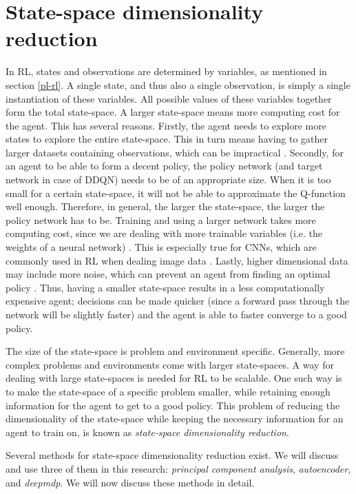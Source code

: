 \section{State-space dimensionality reduction}\label{pl-dimensionality}
In RL, states and observations are determined by variables, as mentioned in section \ref{pl-rl}. A single state, and thus also a single observation, is simply a single instantiation of these variables. All possible values of these variables together form the total state-space. A larger state-space means more computing cost for the agent. This has several reasons. Firstly, the agent needs to explore more states to explore the entire state-space. This in turn means having to gather larger datasets containing observations, which can be impractical \cite{AE-2019}. Secondly, for an agent to be able to form a decent policy, the policy network (and target network in case of DDQN) needs to be of an appropriate size. When it is too small for a certain state-space, it will not be able to approximate the Q-function well enough. Therefore, in general, the larger the state-space, the larger the policy network has to be. Training and using a larger network takes more computing cost, since we are dealing with more trainable variables (i.e. the weights of a neural network) \cite{AE_2019}. This is especially true for CNNs, which are commonly used in RL when dealing image data \cite{CNN_computation}. Lastly, higher dimensional data may include more noise, which can prevent an agent from finding an optimal policy \cite{AE_2016}. Thus, having a smaller state-space results in a less computationally expensive agent; decisions can be made quicker (since a forward pass through the network will be slightly faster) and the agent is able to faster converge to a good policy. 

The size of the state-space is problem and environment specific. Generally, more complex problems and environments come with larger state-spaces. A way for dealing with large state-spaces is needed for RL to be scalable. One such way is to make the state-space of a specific problem smaller, while retaining enough information for the agent to get to a good policy. This problem of reducing the dimensionality of the state-space while keeping the necessary information for an agent to train on, is known as \emph{state-space dimensionality reduction}.  %

Several methods for state-space dimensionality reduction exist. We will discuss and use three of them in this research: \emph{principal component analysis}, \emph{autoencoder}, and \emph{deepmdp}. We will now discuss these methods in detail. %
